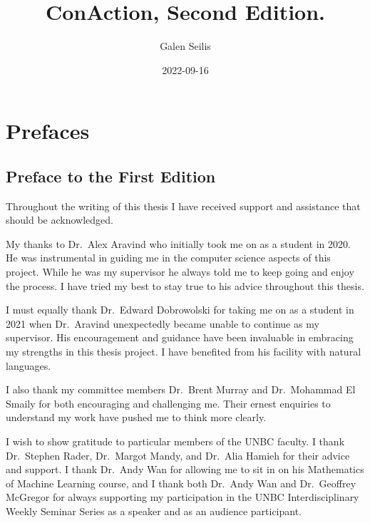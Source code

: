 \documentclass[
  letterpaper,
  DIV=11,
  numbers=noendperiod]{scrreprt}
\title{ConAction, Second Edition.}
\author{Galen Seilis}
\date{2022-09-16}
\renewcommand*\contentsname{Table of contents}
\newcommand\contentsname{Table of contents}
\begin{document}
\maketitle

\renewcommand*\contentsname{Table of contents}
{
\hypersetup{linkcolor=}
\setcounter{tocdepth}{2}
\tableofcontents
}


\chapter*{Prefaces}\label{prefaces}


\section*{Preface to the First
Edition}\label{preface-to-the-first-edition}


Throughout the writing of this thesis I have received support and
assistance that should be acknowledged.

My thanks to Dr.~Alex Aravind who initially took me on as a student in
2020. He was instrumental in guiding me in the computer science aspects
of this project. While he was my supervisor he always told me to keep
going and enjoy the process. I have tried my best to stay true to his
advice throughout this thesis.

I must equally thank Dr.~Edward Dobrowolski for taking me on as a
student in 2021 when Dr.~Aravind unexpectedly became unable to continue
as my supervisor. His encouragement and guidance have been invaluable in
embracing my strengths in this thesis project. I have benefited from his
facility with natural languages.

I also thank my committee members Dr.~Brent Murray and Dr.~Mohammad El
Smaily for both encouraging and challenging me. Their ernest enquiries
to understand my work have pushed me to think more clearly.

I wish to show gratitude to particular members of the UNBC faculty. I
thank Dr.~Stephen Rader, Dr.~Margot Mandy, and Dr.~Alia Hamieh for their
advice and support. I thank Dr.~Andy Wan for allowing me to sit in on
his Mathematics of Machine Learning course, and I thank both Dr.~Andy
Wan and Dr.~Geoffrey McGregor for always supporting my participation in
the UNBC Interdisciplinary Weekly Seminar Series as a speaker and as an
audience participant.
\end{document}
